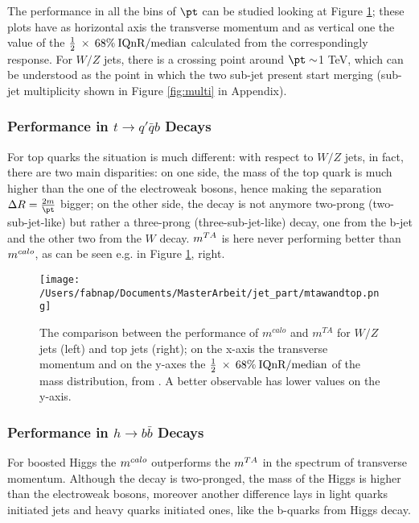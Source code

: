 The performance in all the bins of $\pt$ can be studied looking at Figure \ref{fig:mta3}; these plots have as horizontal axis the transverse momentum and as vertical one the value of the $\frac{1}{2}\: \times\: 68\% \:\textrm{IQnR/median}$ calculated from the correspondingly response. For $W/Z$ jets, there is a crossing point around $\pt\sim$1 TeV, which can be understood as the point in which the two sub-jet present start merging (sub-jet multiplicity shown in Figure \ref{fig:multi} in Appendix).



\subsubsection{Performance in $t\to q'\bar{q}b$ Decays}

For top quarks the situation is much different: with respect to $W/Z$ jets, in fact, there are two main disparities: on one side, the mass of the top quark is much higher than the one of the electroweak bosons, hence making the separation $\Delta R=\frac{2m}{\pt}$ bigger; on the other side, the decay is not anymore two-prong (two-sub-jet-like) but rather a three-prong  (three-sub-jet-like) decay, one from the b-jet and the other two from the $W$ decay.
$m^{TA}$ is here never performing better than $m^{calo}$, as can be seen e.g. in Figure \ref{fig:mta3}, right.


\begin{figure}[!ht]
  \centering
      \texttt{[image: /Users/fabnap/Documents/MasterArbeit/jet\_part/mtawandtop.png]}
  \caption[$m^{calo}$ and $m^{TA}$ comparison for $W/Z$ jets and top jets]{The comparison between the performance of $m^{calo}$ and $m^{TA}$ for $W/Z$ jets (left) and top jets (right); on the x-axis the transverse momentum and on the y-axes the $\frac{1}{2}\: \times\: 68\% \:\textrm{IQnR/median}$ of the mass distribution, from \cite{art35}. A better observable has lower values on the y-axis. }
  \label{fig:mta3}
\end{figure}

\subsubsection{Performance in $h\to b\bar{b}$ Decays}

For boosted Higgs the $m^{calo}$ outperforms the $m^{TA}$ in the spectrum of transverse momentum. Although the decay is two-pronged, the mass of the Higgs is higher than the electroweak bosons, moreover another difference lays in light quarks initiated jets and heavy quarks initiated ones, like the b-quarks from Higgs decay.

